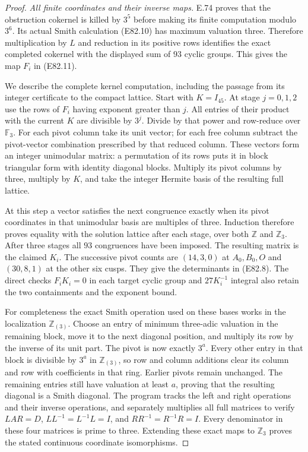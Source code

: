 \begin{proof}
\emph{All finite coordinates and their inverse maps.}
E.74 proves that the obstruction cokernel is killed by
$3^5$ before making its finite computation modulo $3^6$.
Its actual Smith calculation (E82.10) has maximum
valuation three. Therefore multiplication by $L$ and
reduction in its positive rows identifies the exact
completed cokernel with the displayed sum of $93$
cyclic groups. This gives the map $F_i$ in (E82.11).

We describe the complete kernel computation, including
the passage from its integer certificate to the compact
lattice. Start with $K=I_{45}$. At stage $j=0,1,2$ use
the rows of $F_i$ having exponent greater than $j$.
All entries of their product with the current $K$ are
divisible by $3^j$. Divide by that power and row-reduce
over $\mathbb F_3$. For each pivot column take its unit
vector; for each free column subtract the pivot-vector
combination prescribed by that reduced column. These
vectors form an integer unimodular matrix: a permutation
of its rows puts it in block triangular form with
identity diagonal blocks. Multiply its pivot columns
by three, multiply by $K$, and take the integer Hermite
basis of the resulting full lattice.

At this step a vector satisfies the next congruence
exactly when its pivot coordinates in that unimodular
basis are multiples of three. Induction therefore
proves equality with the solution lattice after each
stage, over both $\mathbb Z$ and $\mathbb Z_3$.
After three stages all $93$ congruences have been
imposed. The resulting matrix is the claimed $K_i$.
The successive pivot counts are $(14,3,0)$ at
$A_0,B_0,O$ and $(30,8,1)$ at the other six cusps.
They give the determinants in (E82.8).
The direct checks $F_iK_i=0$ in each target cyclic
group and $27K_i^{-1}$ integral also retain the two
containments and the exponent bound.

For completeness the exact Smith operation used on
these bases works in the localization $\mathbb Z_{(3)}$.
Choose an entry of minimum three-adic valuation in the
remaining block, move it to the next diagonal position,
and multiply its row by the inverse of its unit part.
The pivot is now exactly $3^a$. Every other entry in
that block is divisible by $3^a$ in $\mathbb Z_{(3)}$,
so row and column additions clear its column and row
with coefficients in that ring. Earlier pivots remain
unchanged. The remaining entries still have valuation
at least $a$, proving that the resulting diagonal is
a Smith diagonal. The program tracks the left and right
operations and their inverse operations, and separately
multiplies all full matrices to verify
$LAR=D$, $LL^{-1}=L^{-1}L=I$, and
$RR^{-1}=R^{-1}R=I$. Every denominator in these four
matrices is prime to three. Extending these exact maps
to $\mathbb Z_3$ proves the stated continuous coordinate
isomorphisms.


\end{proof}
